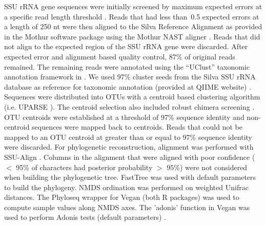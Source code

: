 SSU rRNA gene sequences were initially screened by maximum expected errors at
a specific read length threshold  \citep{edgar2013}. Reads that had less
than~0.5 expected errors at a length of 250 nt were then aligned to the Silva
Reference Alignment as provided in the Mothur software package using the Mothur
NAST aligner \citep{DeSantis2005,schloss2009}. Reads that did not align to the
expected region of the SSU rRNA gene were discarded. After expected error and
alignment based quality control, 87\% of original reads remained. The remaining
reads were annotated using the “UClust” taxonomic annotation framework in
\citep{caparaso2010,edgar2010}. We used 97\% cluster seeds from the Silva
SSU rRNA database \citep{quast2013} as reference for taxonomic annotation
(provided at QIIME website) \citep{quast2013}. Sequences were distributed
into OTUs with a centroid based clustering algorithm (i.e. UPARSE
\citep{edgar2013}). The centroid selection also included robust chimera
screening \citep{edgar2013}. OTU centroids were established at a threshold
of 97\% sequence identity and non-centroid sequences were mapped back to
centroids. Reads that could not be mapped to an OTU centroid at greater
than or equal to 97\% sequence identity were discarded. For phylogenetic
reconstruction, alignment was performed with SSU-Align
\citep{nawrocki2009,nawrocki2013}. Columns in the alignment that were
aligned with poor confidence ($<$ 95\% of characters had posterior
probability $>$ 95\%) were not considered when building
the phylogenetic tree. FastTree \citep{price2010} was used with default
parameters to build the phylogeny. NMDS ordination was performed on
weighted Unifrac \citep{lozupone2005} distances. The Phyloseq
\citep{mcmurdie2013} wrapper for Vegan \citep{oksanen2015} (both
R packages) was used to compute sample values along NMDS axes. The
'adonis' function in Vegan was used to perform Adonis tests (default
parameters) \citep{Anderson2001a}.

